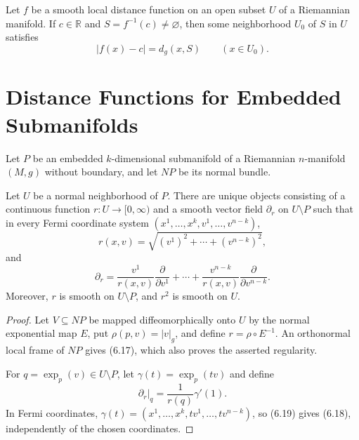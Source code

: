 \begin{corollary}
\label{cor:local-distance-smooth-level-sets}


Let $f$ be a smooth local distance function on an open subset $U$ of a
Riemannian manifold. If $c\in\mathbb R$ and
$S=f^{-1}(c)\neq\varnothing$, then some neighborhood $U_0$ of $S$ in $U$
satisfies
\[
|f(x)-c|=d_g(x,S)
\qquad(x\in U_0).
\]
\end{corollary}

\section{Distance Functions for Embedded Submanifolds}

Let $P$ be an embedded $k$-dimensional submanifold of a Riemannian
$n$-manifold $(M,g)$ without boundary, and let $NP$ be its normal bundle.

\begin{proposition}
\label{prop:fermi-coordinates-radial-function}

Let $U$ be a normal neighborhood of $P$. There are unique objects consisting
of a continuous function $r:U\to[0,\infty)$ and a smooth vector field
$\partial_r$ on $U\setminus P$ such that in every Fermi coordinate system
$(x^1,\ldots,x^k,v^1,\ldots,v^{n-k})$,
\begin{equation}
r(x,v)=\sqrt{(v^1)^2+\cdots+(v^{n-k})^2},
\tag{6.17}
\end{equation}
and
\begin{equation}
\partial_r
=\frac{v^1}{r(x,v)}\frac{\partial}{\partial v^1}
+\cdots+
\frac{v^{n-k}}{r(x,v)}\frac{\partial}{\partial v^{n-k}}.
\tag{6.18}
\end{equation}
Moreover, $r$ is smooth on $U\setminus P$, and $r^2$ is smooth on $U$.
\end{proposition}

\begin{proof}
\sketch Let $V\subseteq NP$ be mapped diffeomorphically onto $U$ by the
normal exponential map $E$, put $\rho(p,v)=|v|_g$, and define
$r=\rho\circ E^{-1}$. An orthonormal local frame of $NP$ gives (6.17), which
also proves the asserted regularity.

For $q=\exp_p(v)\in U\setminus P$, let $\gamma(t)=\exp_p(tv)$ and define
\begin{equation}
\partial_r|_q=\frac1{r(q)}\gamma'(1).
\tag{6.19}
\end{equation}
In Fermi coordinates, $\gamma(t)=(x^1,\ldots,x^k,tv^1,\ldots,tv^{n-k})$,
so (6.19) gives (6.18), independently of the chosen coordinates.
\end{proof}

